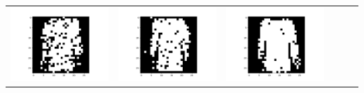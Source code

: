 \documentclass[12pt]{report}
\begin{document}
\begin{table}[H]
\begin{tabular}{  c  c  c  c  c  c }
\begin{minipage}{.15\textwidth}
      \includegraphics[scale=0.2]{BM_c2.png}
    \end{minipage} &
    \begin{minipage}{.15\textwidth}
      \includegraphics[scale=0.2]{BM_c4.png}
    \end{minipage} &
    \begin{minipage}{.15\textwidth}
      \includegraphics[scale=0.2]{BM_c16.png}

\end{minipage}
\end{tabular}
\end{table}
\end{document}
